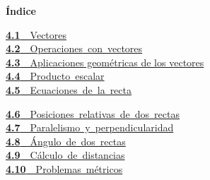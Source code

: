\documentclass[11pt,a4paper]{article}
\begin{document}
\begin{tcolorbox}[colback=fmsurface,colframe=fmsurface,arc=3mm,left=4mm,right=4mm,top=2mm,bottom=2mm]
\small\textbf{Índice}\par\smallskip
\begin{minipage}[t]{0.49\linewidth}\small \mbox{\hyperlink{sec1}{\textbf{\color{fmgreen}4.1}\ \ Vectores}}\\[3pt]
\mbox{\hyperlink{sec2}{\textbf{\color{fmgreen}4.2}\ \ Operaciones con vectores}}\\[3pt]
\hyperlink{sec3}{\textbf{\color{fmgreen}4.3}\ \ Aplicaciones geométricas de los vectores}\\[3pt]
\mbox{\hyperlink{sec4}{\textbf{\color{fmgreen}4.4}\ \ Producto escalar}}\\[3pt]
\mbox{\hyperlink{sec5}{\textbf{\color{fmgreen}4.5}\ \ Ecuaciones de la recta}}\\[3pt]\end{minipage}\hfill\begin{minipage}[t]{0.49\linewidth}\small \mbox{\hyperlink{sec6}{\textbf{\color{fmgreen}4.6}\ \ Posiciones relativas de dos rectas}}\\[3pt]
\mbox{\hyperlink{sec7}{\textbf{\color{fmgreen}4.7}\ \ Paralelismo y perpendicularidad}}\\[3pt]
\mbox{\hyperlink{sec8}{\textbf{\color{fmgreen}4.8}\ \ Ángulo de dos rectas}}\\[3pt]
\mbox{\hyperlink{sec9}{\textbf{\color{fmgreen}4.9}\ \ Cálculo de distancias}}\\[3pt]
\mbox{\hyperlink{sec10}{\textbf{\color{fmgreen}4.10}\ \ Problemas métricos}}\\[3pt]\end{minipage}
\end{tcolorbox}

\end{document}
